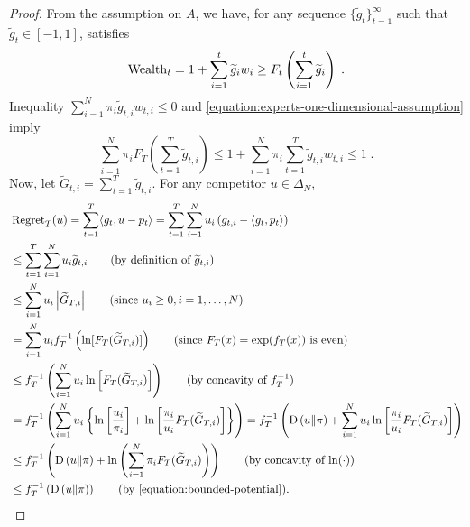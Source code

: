 \begin{proof}
From the assumption on $A$, we have, for any sequence
$\{\widetilde g_t\}_{t=1}^\infty$ such that $\widetilde g_t \in [-1,1]$, satisfies
\begin{equation}
\label{equation:experts-one-dimensional-assumption}
\operatorname{Wealth}_t = 1 + \sum_{i=1}^t \widetilde g_i w_i \ge F_t\left(\sum_{i=1}^t \widetilde g_i\right) \; .
\end{equation}
Inequality $\sum_{i=1}^N \pi_i \widetilde g_{t,i} w_{t,i} \le 0$ and \eqref{equation:experts-one-dimensional-assumption} imply
\begin{equation}
\label{equation:bounded-potential}
\sum_{i=1}^N  \pi_i F_T \left(\sum_{t=1}^T \widetilde g_{t,i} \right)
\le 1 + \sum_{i=1}^N \pi_i \sum_{t=1}^T  \widetilde g_{t,i} w_{t,i} \le 1 \; .
\end{equation}
Now, let $\widetilde G_{t,i} =
\sum_{t=1}^T \widetilde g_{t,i}$. For any competitor $u \in \Delta_N$,
\begingroup
\allowdisplaybreaks
\begin{align*}
\allowdisplaybreaks
&\Regret_T(u)
= \sum_{t=1}^T \langle g_t, u - p_t \rangle
= \sum_{t=1}^T \sum_{i=1}^N u_i \left(g_{t,i} - \langle g_t, p_t \rangle \right) \\
& \le \sum_{t=1}^T \sum_{i=1}^N u_i \widetilde g_{t,i} \qquad \text{(by definition of $\widetilde g_{t,i}$)} \\
& \le \sum_{i=1}^N u_i \left|\widetilde G_{T,i}\right| \qquad \text{(since $u_i \ge 0, i=1,\ldots, N$)}  \\
& = \sum_{i=1}^N u_i f_T^{-1}\left(\ln [F_T(\widetilde G_{T,i})] \right)  \qquad \text{(since $F_T(x) = \exp(f_T(x))$ is even)} \\
& \le f_T^{-1}\left(\sum_{i=1}^N u_i \ln \left[ F_T(\widetilde G_{T,i}) \right]\right) \qquad \text{(by concavity of $f_T^{-1}$)} \\
& = f_T^{-1}\left(\sum_{i=1}^N u_i \left\{\ln \left[\frac{u_i}{\pi_i}\right] +\ln \left[ \frac{\pi_i}{u_i} F_T(\widetilde G_{T,i}) \right] \right\} \right)
= f_T^{-1}\left(\KL{u}{\pi}+\sum_{i=1}^N u_i\ln \left[\frac{\pi_i}{u_i} F_T(\widetilde G_{T,i}) \right]\right) \\
& \le f_T^{-1}\left(\KL{u}{\pi}+\ln \left(\sum_{i=1}^N \pi_i F_T(\widetilde G_{T,i}) \right)\right) \qquad \text{(by concavity of $\ln(\cdot)$)} \\
& \le f_T^{-1}\left(\KL{u}{\pi}\right) \qquad \text{(by \eqref{equation:bounded-potential})}.
\end{align*}
\endgroup
\end{proof}
